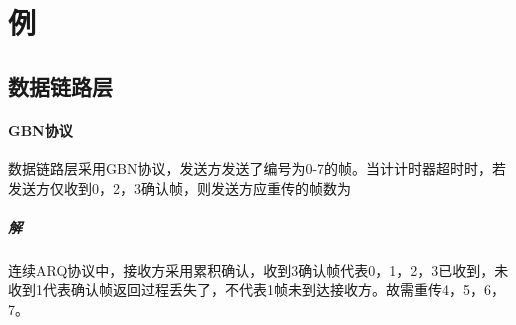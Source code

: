 
\chapter{例}

\section{数据链路层}

\subsubsection{GBN协议}
数据链路层采用GBN协议，发送方发送了编号为0-7的帧。当计计时器超时时，若发送方仅收到0，2，3确认帧，则发送方应重传的帧数为

\paragraph{解}
连续ARQ协议中，接收方采用累积确认，收到3确认帧代表0，1，2，3已收到，未收到1代表确认帧返回过程丢失了，不代表1帧未到达接收方。故需重传4，5，6，7。


